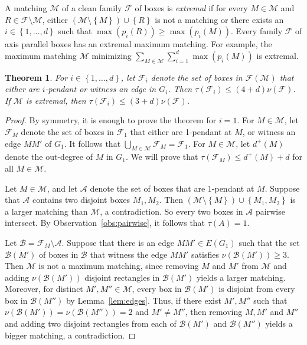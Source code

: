 \documentclass[12pt]{amsart}
\theoremstyle{plain}
\newtheorem{theorem}{Theorem}[section]
\theoremstyle{definition}
\theoremstyle{remark}
\newcommand{\F}{\mathcal{F}}
\newcommand{\M}{\mathcal{M}}
\newcommand{\sset}[1]{\left\{#1\right\}}
\begin{document}
A matching $\M$ of a clean family $\F$ of boxes is \emph{extremal} if for every $M \in \M$ and $R \in \F \setminus \M$, either $(\M \setminus \sset{M}) \cup \sset{R}$ is not a matching or there exists an $i \in \sset{1, \dots, d}$ such that $\max(p_i(R)) \geq \max (p_i(M))$. Every family $\F$ of axis parallel boxes has an extremal maximum matching. For example, the maximum matching $\M$ minimizing $\sum_{M \in \M} \sum_{i=1}^d \max(p_i(M))$ is extremal. 

\begin{theorem} \label{thm:cover} For $i \in \sset{1,\dots, d}$, let $\F_i$ denote the set of boxes in $\F(\M)$ that either are $i$-pendant or witness an edge in $G_i$. Then $\tau(\F_i) \leq (4+d)\nu(\F)$. If $\M$ is extremal, then  $\tau(\F_i) \leq (3+d)\nu(\F)$.
\end{theorem}
\begin{proof}
By symmetry, it is enough to prove the theorem for $i=1$. For $M \in \M$, let $\F_M$ denote the set of boxes in $\F_1$ that either are 1-pendant at $M$, or witness an edge $MM'$ of $G_1$. It follows that $\bigcup_{M \in \M} \F_M = \F_1$. For $M \in \M$, let $d^+(M)$ denote the out-degree of $M$ in $G_1$. We will prove that $\tau(\F_M) \leq d^+(M) + d$ for all $M \in \M$. 

Let $M \in \M$, and let $\mathcal{A}$ denote the set of boxes that are $1$-pendant at $M$. Suppose that $\mathcal{A}$ contains two disjoint boxes $M_1, M_2$. Then $(\M \setminus \sset{M}) \cup \sset{M_1, M_2}$ is a larger matching than $\M$, a contradiction. So every two boxes in $\mathcal{A}$ pairwise intersect. By Observation~\ref{obs:pairwise}, it follows that $\tau(A) = 1$. 

Let $\mathcal{B} = \F_M \setminus \mathcal{A}$. Suppose that there is an edge $MM' \in E(G_1)$ such that the set $\mathcal{B}(M')$ of boxes in $\mathcal{B}$ that witness the edge $MM'$ satisfies $\nu(\mathcal{B}(M')) \geq 3$. Then $\M$ is not a maximum matching, since removing $M$ and $M'$ from $\M$ and adding $\nu(\mathcal{B}(M'))$ disjoint rectangles in $\mathcal{B}(M')$ yields a larger matching.  Moreover, for distinct $M', M'' \in \M$, every box in $\mathcal{B}(M')$ is disjoint from every box in $\mathcal{B}(M'')$ by Lemma~\ref{lem:edges}. Thus, if there exist $M', M''$ such that $\nu(\mathcal{B}(M')) = \nu(\mathcal{B}(M'')) = 2$ and $M' \neq M''$, then removing $M, M'$ and $M''$ and adding two disjoint rectangles from each of $\mathcal{B}(M')$ and $\mathcal{B}(M'')$ yields a bigger matching, a contradiction. 


\end{proof}
\end{document}
